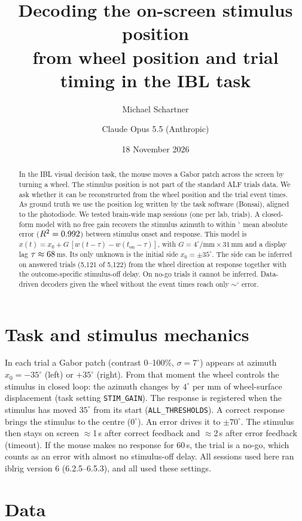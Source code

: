 \documentclass[11pt,a4paper]{article}
\title{Decoding the on-screen stimulus position\\from wheel position and trial timing in the IBL task}
\author{Michael Schartner \and Claude Opus 5.5 (Anthropic)}
\date{18 November 2026}
\begin{document}
\maketitle

\begin{abstract}
In the IBL visual decision task, the mouse moves a Gabor patch across the screen by turning a wheel.
The stimulus position is not part of the standard ALF trials data. We ask whether it can be reconstructed
from the wheel position and the trial event times. As ground truth we use the position log written by the
task software (Bonsai), aligned to the photodiode. We tested \NSessions{} brain-wide map sessions (one per lab,
\NTrials{} trials). A closed-form model with no free gain recovers the stimulus azimuth to within
\PreMAE$^\circ$ mean absolute error ($R^2=0.992$) between stimulus onset and response. This model is
$x(t) = x_0 + G\,[w(t-\tau) - w(t_\mathrm{on}-\tau)]$, with $G=4^\circ/\mathrm{mm}\times 31\,\mathrm{mm}$ and a
display lag $\tau\approx68$\,ms. Its only unknown is the initial side $x_0=\pm35^\circ$. The side can be
inferred on answered trials (5{,}121 of 5{,}122) from the wheel direction at response together with the
outcome-specific stimulus-off delay. On no-go trials it cannot be inferred. Data-driven decoders given the wheel without the
event times reach only $\sim$\TzeroMAE$^\circ$ error.
\end{abstract}

\section{Task and stimulus mechanics}
In each trial a Gabor patch (contrast 0--100\%, $\sigma=7^\circ$) appears at azimuth $x_0=-35^\circ$ (left) or
$+35^\circ$ (right). From that moment the wheel controls the stimulus in closed loop: the azimuth changes by
$4^\circ$ per mm of wheel-surface displacement (task setting \texttt{STIM\_GAIN}). The response is registered
when the stimulus has moved $35^\circ$ from its start (\texttt{ALL\_THRESHOLDS}). A correct response brings the
stimulus to the centre ($0^\circ$). An error drives it to $\pm70^\circ$. The stimulus then stays on screen
$\approx$1\,s after correct feedback and $\approx$2\,s after error feedback (timeout). If the mouse makes no
response for 60\,s, the trial is a no-go, which counts as an error with almost no stimulus-off delay. All
sessions used here ran iblrig version 6 (6.2.5--6.5.3), and all used these settings.

\section{Data}
\end{document}
